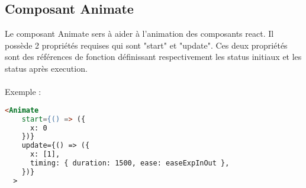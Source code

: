 \documentclass[a4paper, french, 12pt]{extarticle}
\begin{document}
\subsection{Composant Animate}
Le composant Animate sers à aider à l'animation des composants react. Il possède 2 propriétés requises qui sont "start" et "update". Ces deux propriétés sont des références de fonction définissant respectivement les status initiaux et les status après execution.\\\\
Exemple :
\begin{lstlisting}[language=html]
  <Animate
    start={() => ({
      x: 0
    })}
    update={() => ({
      x: [1],
      timing: { duration: 1500, ease: easeExpInOut },
    })}
  >
\end{lstlisting}
\end{document}
